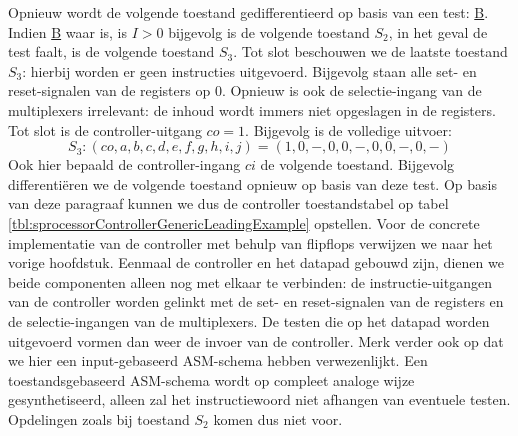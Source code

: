 Opnieuw wordt de volgende toestand gedifferentieerd op basis van een test: \underline{B}. Indien \underline{B} waar is, is $I>0$ bijgevolg is de volgende toestand $S_2$, in het geval de test faalt, is de volgende toestand $S_3$. Tot slot beschouwen we de laatste toestand $S_3$: hierbij worden er geen instructies uitgevoerd. Bijgevolg staan alle set- en reset-signalen van de registers op 0. Opnieuw is ook de selectie-ingang van de multiplexers irrelevant: de inhoud wordt immers niet opgeslagen in de registers. Tot slot is de controller-uitgang $co=1$. Bijgevolg is de volledige uitvoer:
\begin{equation}
S_3:\left(co,a,b,c,d,e,f,g,h,i,j\right)=\left(1,0,-,0,0,-,0,0,-,0,-\right)
\end{equation}
Ook hier bepaald de controller-ingang $ci$ de volgende toestand. Bijgevolg differenti\"eren we de volgende toestand opnieuw op basis van deze test. Op basis van deze paragraaf kunnen we dus de controller toestandstabel op tabel \ref{tbl:sprocessorControllerGenericLeadingExample} opstellen. Voor de concrete implementatie van de controller met behulp van flipflops verwijzen we naar het vorige hoofdstuk. Eenmaal de controller en het datapad gebouwd zijn, dienen we beide componenten alleen nog met elkaar te verbinden: de instructie-uitgangen van de controller worden gelinkt met de set- en reset-signalen van de registers en de selectie-ingangen van de multiplexers. De testen die op het datapad worden uitgevoerd vormen dan weer de invoer van de controller. Merk verder ook op dat we hier een input-gebaseerd ASM-schema hebben verwezenlijkt. Een toestandsgebaseerd ASM-schema wordt op compleet analoge wijze gesynthetiseerd, alleen zal het instructiewoord niet afhangen van eventuele testen. Opdelingen zoals bij
toestand $S_2$ komen dus niet voor.
